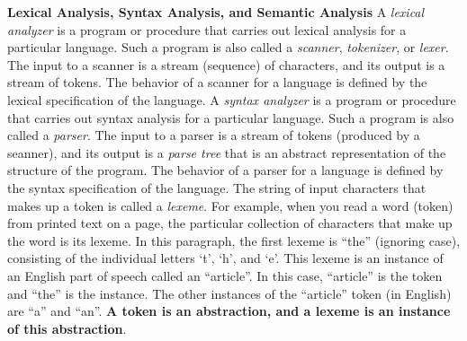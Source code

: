 \begin{minipage}[t]{\sw}
\slidenumber
\LARGE
{\bf Lexical Analysis, Syntax Analysis, and Semantic Analysis}\exx
A {\em lexical analyzer} is a program or procedure
that carries out lexical analysis for a particular language.
Such a program is also called a {\em scanner},
{\em tokenizer}, or {\em lexer}.
The input to a scanner is a stream (sequence) of characters,
and its output is a stream of tokens.
The behavior of a scanner for a language is defined
by the lexical specification of the language.\exx
A {\em syntax analyzer} is a program or procedure
that carries out syntax analysis for a particular language.
Such a program is also called a {\em parser}.
The input to a parser is a stream of tokens
(produced by a seanner),
and its output is a {\em parse tree}
that is an abstract representation of the structure of the program.
The behavior of a parser for a language is defined
by the syntax specification of the language.\exx
The string of input characters that makes up a token
is called a {\em lexeme}.
For example, when you read a word (token) from printed text on a page,
the particular collection of characters that make up the word is its lexeme.
In this paragraph, the first lexeme is ``the'' (ignoring case),
consisting of the individual letters `t', `h', and `e'.
This lexeme is an instance of an English part of speech called an ``article''.
In this case, ``article'' is the token and ``the'' is the instance.
The other instances of the ``article'' token (in English)
are ``a'' and ``an''.
{\bf A token is an abstraction, and a lexeme 
is an instance of this abstraction}.\exx
\end{minipage}
\clearpage
